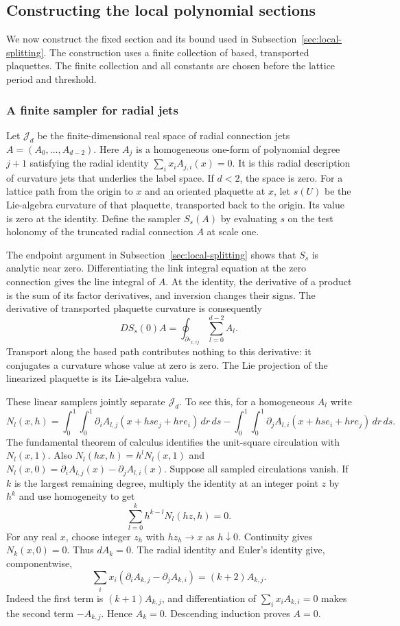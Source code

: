 \subsection{Constructing the local polynomial sections}
\label{sec:local-sections}
We now construct the fixed section and its bound used in
Subsection~\ref{sec:local-splitting}. The construction uses a finite
collection of based, transported plaquettes. The finite collection
and all constants are chosen before the lattice period and threshold.

\subsubsection{A finite sampler for radial jets}
Let $\mathcal J_d$ be the finite-dimensional real space of radial
connection jets $A=(A_0,\ldots,A_{d-2})$. Here $A_j$ is a homogeneous
one-form of polynomial degree $j+1$ satisfying the radial identity
$\sum_i x_iA_{j,i}(x)=0$. It is this radial description of curvature
jets that underlies the label space. If $d<2$, the space is zero.
For a lattice path from the origin to $x$ and an oriented plaquette
at $x$, let $s(U)$ be the Lie-algebra curvature of that plaquette,
transported back to the origin. Its value is zero at the identity.
Define the sampler $S_s(A)$ by evaluating $s$ on the test holonomy
of the truncated radial connection $A$ at scale one.

The endpoint argument in Subsection~\ref{sec:local-splitting} shows
that $S_s$ is analytic near zero. Differentiating the link integral
equation at the zero connection gives the line integral of $A$.
At the identity, the derivative of a product is the sum of its
factor derivatives, and inversion changes their signs. The derivative
of transported plaquette curvature is consequently
\[
 DS_s(0)A=\oint_{\partial\square_{x,ij}}
                          \sum_{l=0}^{d-2}A_l.
\]
Transport along the based path contributes nothing to this derivative:
it conjugates a curvature whose value at zero is zero. The Lie
projection of the linearized plaquette is its Lie-algebra value.

These linear samplers jointly separate $\mathcal J_d$. To see this,
for a homogeneous $A_l$ write
\[
 N_l(x,h)=\int_0^1\!\int_0^1
   \partial_i A_{l,j}(x+hs e_j+hr e_i)\,dr\,ds
 -\int_0^1\!\int_0^1
   \partial_j A_{l,i}(x+hs e_i+hr e_j)\,dr\,ds.
\]
The fundamental theorem of calculus identifies the unit-square
circulation with $N_l(x,1)$. Also
$N_l(hx,h)=h^lN_l(x,1)$ and
$N_l(x,0)=\partial_i A_{l,j}(x)-\partial_j A_{l,i}(x)$.
Suppose all sampled circulations vanish. If $k$ is the largest
remaining degree, multiply the identity at an integer point $z$
by $h^k$ and use homogeneity to get
\[
                       \sum_{l=0}^k h^{k-l}N_l(hz,h)=0.
\]
For any real $x$, choose integer $z_h$ with $hz_h\to x$ as
$h\downarrow0$. Continuity gives $N_k(x,0)=0$. Thus $dA_k=0$.
The radial identity and Euler's identity give, componentwise,
\[
 \sum_i x_i(\partial_i A_{k,j}-\partial_j A_{k,i})
                                      =(k+2)A_{k,j}.
\]
Indeed the first term is $(k+1)A_{k,j}$, and differentiation of
$\sum_i x_iA_{k,i}=0$ makes the second term $-A_{k,j}$.
Hence $A_k=0$. Descending induction proves $A=0$.


